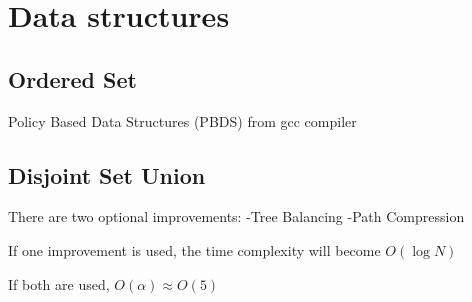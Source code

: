 \chapter{Data structures}

\section{Ordered Set}

    Policy Based Data Structures (PBDS) from gcc compiler


\section{Disjoint Set Union}

    There are two optional improvements:
        -Tree Balancing 
        -Path Compression

    If one improvement is used, 
    the time complexity will become $O(\log{N})$

    If both are used, $O(\alpha) \approx O(5)$

